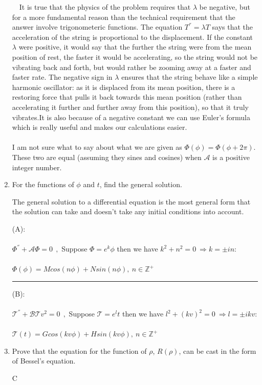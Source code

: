 \documentclass[fleqn]{article}
\begin{document}
\begin{enumerate}
      \textcolor{hwColor}{
        $~~~$ It is true that the physics of the problem requires that $\lambda$ be negative, but for a more fundamental reason than the technical 
        requirement that the answer involve trigonometeric functions.
        The equation $T^{''}=\lambda T$ says that the acceleration of the string is proportional to the displacement. 
        If the constant $\lambda$ were positive, it would say that the further the string were from the mean position of rest, 
        the faster it would be accelerating, so the string would not be vibrating back and forth, 
        but would rather be zooming away at a faster and faster rate.
        The negative sign in $\lambda$ ensures that the string behave like a simple harmonic oscillator: 
        as it is displaced from its mean position, there is a restoring force that pulls it back towards this mean 
        position (rather than accelerating it further and further away from this position), so that it truly vibrates.It is also because of a negative constant we can use Euler’s formula which is really useful and makes our calculations easier.
        \\
        \\
        I am not sure what to say about what we are given as $\Phi(\phi)=\Phi(\phi+ 2\pi)$. These two are equal (assuming they sines and cosines)
        when $\mathcal{A}$ is a positive integer number.
      }

    \pagebreak

    \item For the functions of $\phi$ and $t$, find the general solution. 

      \textcolor{hwColor}{
        The general solution to a differential equation is the most general form that the 
        solution can take and doesn't take any initial conditions into account. \\
      }

      \textcolor{hwColor}{
        (A): \\ \\
        $\Phi^{''}+\mathcal{A}\Phi=0 ~~,$ Suppose $\Phi=e^k \phi$ then we have $k^2+n^2=0 ~ \Rightarrow k=\pm in$: \\ \\
        $
          \Phi(\phi)=M cos(n \phi)+N sin(n \phi), ~ n\in \mathbb{Z}^{+} 
        $
      }

      \rule{15cm}{1pt}

      \textcolor{hwColor}{
        (B): \\ \\
        $\mathcal{T}^{''}+\mathcal{B}\mathcal{T}v^2=0 ~~,$ Suppose $\mathcal{T}=e^lt$ then we have $l^2+(k v)^2=0 ~ \Rightarrow l=\pm ikv$: \\
        \\
        $
          \mathcal{T}(t)=G cos(kv \phi)+H sin(kv \phi), ~ n\in \mathbb{Z}^{+} 
        $
      }

    \item Prove that the equation for the function of $\rho$, $R(\rho)$, can be cast in the form of Bessel's equation.

      \textcolor{hwColor}{
        C
      }

  \end{enumerate}
\end{document}
